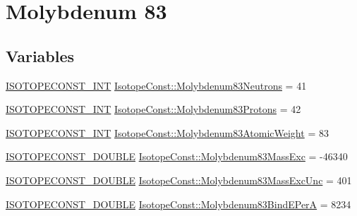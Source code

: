 \hypertarget{group___isotope_const-_molybdenum-_mo83}{}\section{Molybdenum 83}
\label{group___isotope_const-_molybdenum-_mo83}
\subsection*{Variables}
\begin{DoxyCompactItemize}
\item 
\mbox{\hyperlink{group___isotope_const-_macros_ga5f18360b3e99483a35c32d789e62621c}{I\+S\+O\+T\+O\+P\+E\+C\+O\+N\+S\+T\+\_\+\+I\+NT}} \mbox{\hyperlink{group___isotope_const-_molybdenum-_mo83_ga97f27cf0f5aeac768599b3a8c43148c6}{Isotope\+Const\+::\+Molybdenum83\+Neutrons}} = 41
\item 
\mbox{\hyperlink{group___isotope_const-_macros_ga5f18360b3e99483a35c32d789e62621c}{I\+S\+O\+T\+O\+P\+E\+C\+O\+N\+S\+T\+\_\+\+I\+NT}} \mbox{\hyperlink{group___isotope_const-_molybdenum-_mo83_ga29edabf730d6a38b40b2037c1b6c70ee}{Isotope\+Const\+::\+Molybdenum83\+Protons}} = 42
\item 
\mbox{\hyperlink{group___isotope_const-_macros_ga5f18360b3e99483a35c32d789e62621c}{I\+S\+O\+T\+O\+P\+E\+C\+O\+N\+S\+T\+\_\+\+I\+NT}} \mbox{\hyperlink{group___isotope_const-_molybdenum-_mo83_gab4d17f1dacecbd21ecbff940349cdb28}{Isotope\+Const\+::\+Molybdenum83\+Atomic\+Weight}} = 83
\item 
\mbox{\hyperlink{group___isotope_const-_macros_ga8f45a7272ce02c0b4c65c44636ed719a}{I\+S\+O\+T\+O\+P\+E\+C\+O\+N\+S\+T\+\_\+\+D\+O\+U\+B\+LE}} \mbox{\hyperlink{group___isotope_const-_molybdenum-_mo83_gaa49a24c3a685ef0888ac6f91efeb5180}{Isotope\+Const\+::\+Molybdenum83\+Mass\+Exc}} = -\/46340
\item 
\mbox{\hyperlink{group___isotope_const-_macros_ga8f45a7272ce02c0b4c65c44636ed719a}{I\+S\+O\+T\+O\+P\+E\+C\+O\+N\+S\+T\+\_\+\+D\+O\+U\+B\+LE}} \mbox{\hyperlink{group___isotope_const-_molybdenum-_mo83_ga15ca3e7db6ad29ea191b43008aaf4d06}{Isotope\+Const\+::\+Molybdenum83\+Mass\+Exc\+Unc}} = 401
\item 
\mbox{\hyperlink{group___isotope_const-_macros_ga8f45a7272ce02c0b4c65c44636ed719a}{I\+S\+O\+T\+O\+P\+E\+C\+O\+N\+S\+T\+\_\+\+D\+O\+U\+B\+LE}} \mbox{\hyperlink{group___isotope_const-_molybdenum-_mo83_ga510b6157b5704cbdf7ea6d1bc442a584}{Isotope\+Const\+::\+Molybdenum83\+Bind\+E\+PerA}} = 8234
\item 

\end{DoxyCompactItemize}
